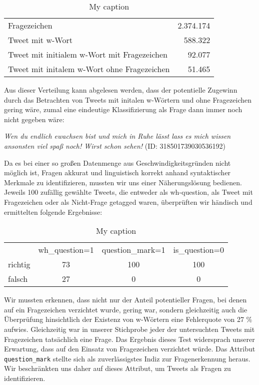 \documentclass[main.tex]{subfiles}
\begin{document}
\begin{table}[h]
\centering
\begin{tabular}{lr}
Fragezeichen                                & 2.374.174 \\
Tweet mit w-Wort                            & 588.322   \\
Tweet mit initialem w-Wort mit Fragezeichen & 92.077    \\
Tweet mit initalem w-Wort ohne Fragezeichen & 51.465   
\end{tabular}
\caption{My caption}
\label{my-label}
\end{table}

Aus dieser Verteilung kann abgelesen werden, dass der potentielle Zugewinn durch das Betrachten von Tweets mit initalen w-Wörtern und ohne Fragezeichen gering wäre, zumal eine eindeutige Klassifizierung als Frage dann immer noch nicht gegeben wäre:


\textit{Wen du endlich ewachsen bist und mich in Ruhe lässt lass es mich wissen ansonsten viel spaß noch! Wirst schon sehen!} (ID: 318501739030536192)

Da es bei einer so großen Datenmenge aus Geschwindigkeitsgründen nicht möglich ist, Fragen akkurat und linguistisch korrekt anhand syntaktischer Merkmale zu identifizieren, mussten wir uns einer Näherungslösung bedienen. Jeweils 100 zufällig gewählte Tweets, die entweder als wh-question, als Tweet mit Fragezeichen oder als Nicht-Frage getagged waren, überprüften wir händisch und ermittelten folgende Ergebnisse:

\begin{table}[h]
\centering
\begin{tabular}{lccc}
        & wh\_question=1 & question\_mark=1 & is\_question=0 \\
richtig & 73           & 100            & 100            \\
falsch  & 27           & 0              & 0             
\end{tabular}
\caption{My caption}
\label{my-label}
\end{table}

Wir mussten erkennen, dass nicht nur der Anteil potentieller Fragen, bei denen auf ein Fragezeichen verzichtet wurde, gering war, sondern gleichzeitig auch die Überprüfung hinsichtlich der Existenz von w-Wörtern eine Fehlerquote von 27 \% aufwies. Gleichzeitig war in unserer Stichprobe jeder der untersuchten Tweets mit Fragezeichen tatsächlich eine Frage. Das Ergebnis dieses Test widersprach unserer Erwartung, dass auf den Einsatz von Fragezeichen verzichtet würde. Das Attribut \texttt{question\_mark} stellte sich als zuverlässigstes Indiz zur Fragenerkennung heraus. Wir beschränkten uns daher auf dieses Attribut, um Tweets als Fragen zu identifizieren.
\end{document}
